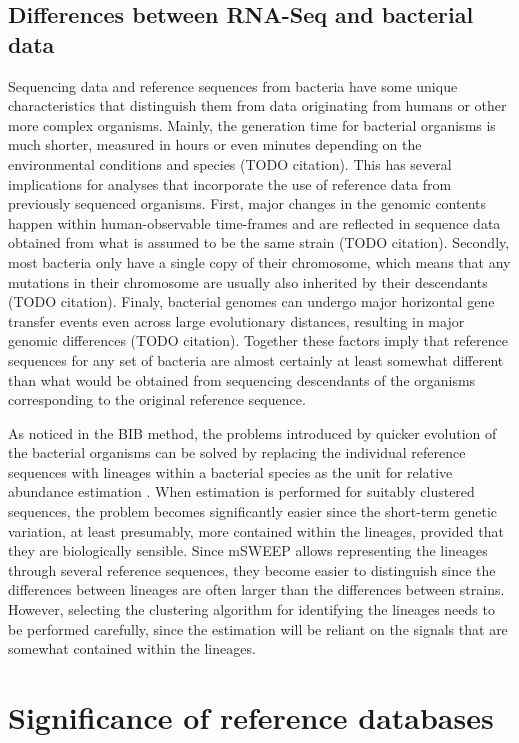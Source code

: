 \documentclass[officiallayout]{tktla}
\begin{document}
\subsection{Differences between RNA-Seq and bacterial data}
\label{section:bacterial-data}

Sequencing data and reference sequences from bacteria have some unique
characteristics that distinguish them from data originating from
humans or other more complex organisms. Mainly, the generation time
for bacterial organisms is much shorter, measured in hours or even
minutes depending on the environmental conditions and species (TODO
citation). This has several implications for analyses that incorporate
the use of reference data from previously sequenced organisms. First,
major changes in the genomic contents happen within human-observable
time-frames and are reflected in sequence data obtained from what is
assumed to be the same strain (TODO citation). Secondly, most bacteria
only have a single copy of their chromosome, which means that any
mutations in their chromosome are usually also inherited by their
descendants (TODO citation). Finaly, bacterial genomes can undergo
major horizontal gene transfer events even across large evolutionary
distances, resulting in major genomic differences (TODO
citation). Together these factors imply that reference sequences for
any set of bacteria are almost certainly at least somewhat different
than what would be obtained from sequencing descendants of the
organisms corresponding to the original reference sequence.

As noticed in the BIB method, the problems introduced by quicker
evolution of the bacterial organisms can be solved by replacing the
individual reference sequences with lineages within a bacterial
species as the unit for relative abundance estimation
\citep{sankar2016bayesian}. When estimation is performed for suitably
clustered sequences, the problem becomes significantly easier since
the short-term genetic variation, at least presumably, more contained
within the lineages, provided that they are biologically
sensible. Since mSWEEP allows representing the lineages through
several reference sequences, they become easier to distinguish since
the differences between lineages are often larger than the differences
between strains. However, selecting the clustering algorithm for
identifying the lineages needs to be performed carefully, since the
estimation will be reliant on the signals that are somewhat contained
within the lineages.

\section{Significance of reference databases}
\end{document}
